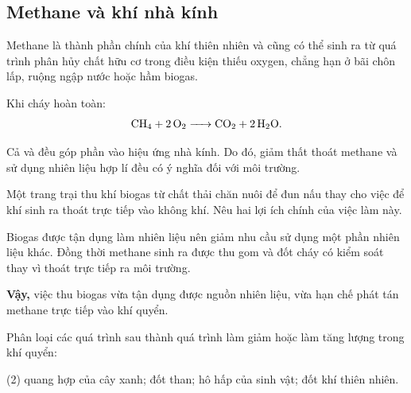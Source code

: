 \subsection{Methane và khí nhà kính}

Methane  là thành phần chính của khí thiên nhiên và cũng có thể sinh ra từ quá trình phân hủy chất hữu cơ trong điều kiện thiếu oxygen, chẳng hạn ở bãi chôn lấp, ruộng ngập nước hoặc hầm biogas.

Khi cháy hoàn toàn:
\[
\ce{CH4 + 2O2 -> CO2 + 2H2O}.
\]

Cả  và  đều góp phần vào hiệu ứng nhà kính. Do đó, giảm thất thoát methane và sử dụng nhiên liệu hợp lí đều có ý nghĩa đối với môi trường.

\begin{vidu}
Một trang trại thu khí biogas từ chất thải chăn nuôi để đun nấu thay cho việc để khí sinh ra thoát trực tiếp vào không khí. Nêu hai lợi ích chính của việc làm này.
\end{vidu}
\begin{loigiai}
Biogas được tận dụng làm nhiên liệu nên giảm nhu cầu sử dụng một phần nhiên liệu khác. Đồng thời methane sinh ra được thu gom và đốt cháy có kiểm soát thay vì thoát trực tiếp ra môi trường.

\textbf{Vậy,} việc thu biogas vừa tận dụng được nguồn nhiên liệu, vừa hạn chế phát tán methane trực tiếp vào khí quyển.
\end{loigiai}

\begin{tuluyen}
Phân loại các quá trình sau thành quá trình làm giảm hoặc làm tăng lượng  trong khí quyển:
\begin{tasks}(2)
\task quang hợp của cây xanh;
\task đốt than;
\task hô hấp của sinh vật;
\task đốt khí thiên nhiên.
\end{tasks}
\end{tuluyen}
